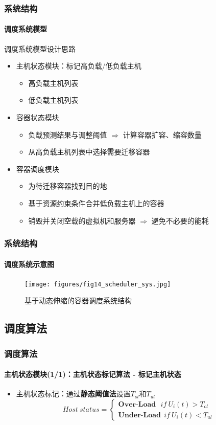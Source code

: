 \begin{frame}
\frametitle{系统结构}
\framesubtitle{调度系统模型}
\begin{exampleblock}{调度系统模型设计思路}
\begin{itemize}
    \item 主机状态模块：标记高负载/低负载主机
    \begin{itemize}
            \item 高负载主机列表
            \item 低负载主机列表
    \end{itemize}
    \item 容器状态模块
    \begin{itemize}
        \item 负载预测结果与调整阈值 $\Rightarrow$ 计算容器扩容、缩容数量
        \item 从高负载主机列表中选择需要迁移容器
    \end{itemize}
    \item 容器调度模块
     \begin{itemize}
             \item 为待迁移容器找到目的地
             \item 基于资源约束条件合并低负载主机上的容器
             \item 销毁并关闭空载的虚拟机和服务器 $\Rightarrow$ 避免不必要的能耗
     \end{itemize}
\end{itemize}
\end{exampleblock}
\end{frame}

\begin{frame}
\frametitle{系统结构}
\framesubtitle{调度系统示意图}
\begin{figure}[htb]
    \centering
    \texttt{[image: figures/fig14\_scheduler\_sys.jpg]}
    \caption{基于动态伸缩的容器调度系统结构}
    \label{fig:fig14}
\end{figure}
\bigskip
\end{frame}

\subsection{调度算法}

\begin{frame}
\frametitle{调度算法}
\framesubtitle{主机状态模块(1/1)：主机状态标记算法 - 标记主机状态}
\begin{itemize}
    \item 主机状态标记：通过\textbf{静态阈值法}设置$T_{ol}$和$T_{ul}$
    \begin{equation}
        Host\ status =
        \begin{cases}
            \textbf{Over-Load} \ \ \ if \ U_i(t) > T_{ol} \\
            \textbf{Under-Load} \ \ if\ U_i(t) < T_{ul}
        \end{cases}
    \end{equation}
\end{itemize}
\end{frame}

